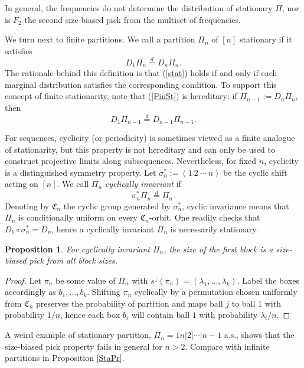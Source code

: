 \documentclass{article}
\newtheorem{proposition}{Proposition}
\begin{document}
In general,    the frequencies do not determine the distribution of stationary $\Pi$, nor is 
$F_2$  the second size-biased pick from the multiset of frequencies.


\vskip0.2cm
We turn next to finite partitions. We call a partition $\Pi_n$ of $[n]$ stationary if it satisfies
\begin{equation}\label{FinSt}
D_1\Pi_n \stackrel d= D_n\Pi_n.
\end{equation}
The rationale behind this definition is that (\ref{stat}) holds if and only if each marginal distribution satisfies the corresponding condition. To support this concept of finite stationarity, note that (\ref{FinSt}) is hereditary: if $\Pi_{n-1} := D_n \Pi_n$, then
\[
D_1 \Pi_{n-1} \stackrel d= D_{n-1} \Pi_{n-1}.
\]

For sequences, cyclicity (or periodicity) is sometimes viewed as a finite analogue of stationarity, but this property is not hereditary and can only be used to construct projective limits along subsequences. Nevertheless, for fixed $n$, cyclicity is a distinguished  symmetry property.
Let $\sigma_n^*:=(1~2~\cdots~n)$ be the cyclic shift acting on $[n]$. We call $\Pi_n$ {\it cyclically invariant} if
\[
\sigma_n^*\Pi_n \stackrel{d}{=} \Pi_n.
\]
Denoting by ${\mathfrak C}_n$ the cyclic group generated by $\sigma_n^*$, cyclic invariance means that $\Pi_n$ is conditionally uniform on every ${\mathfrak C}_n$-orbit.
One readily checks that $D_1 \circ \sigma_n^* = D_n$, hence a cyclically invariant $\Pi_n$ is necessarily stationary.

\begin{proposition}
For cyclically invariant  $\Pi_n$, the size of the first block is a size-biased pick from all block sizes.
\end{proposition}
\begin{proof}  
Let $\pi_n$ be some value of  $\Pi_n$ with $s^{\downarrow}(\pi_n)=(\lambda_1,\ldots,\lambda_k)$. Label the boxes accordingly as $b_1,\ldots,b_k$. 
Shifting $\pi_n$  cyclically by a permutation chosen uniformly from  ${\mathfrak C}_n$ preserves the probability of partition and maps ball $j$ to ball $1$ with probability $1/n$, hence each box $b_i$ will 
contain ball $1$ with probability $\lambda_i/n$. 
\end{proof}
A weird example of stationary partition, $\Pi_n=1n|2|\cdots|n-1$ a.s., shows that the size-biased pick property fails in general for $n>2$. Compare with infinite partitions in Proposition \ref{StaPr}.
\end{document}
